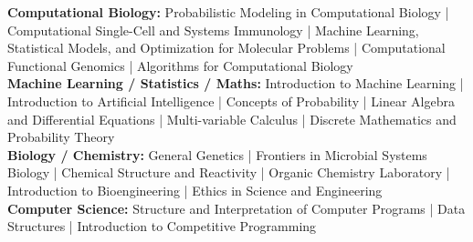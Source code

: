 \newcommand{\coursework}[2]{
    \vspace{4pt}
    \textbf{#1:} #2 \\
}


\coursework{Computational Biology}{Probabilistic Modeling in Computational Biology | Computational Single-Cell and Systems Immunology | Machine Learning, Statistical Models, and Optimization for Molecular Problems | Computational Functional Genomics | Algorithms for Computational Biology }

\coursework{Machine Learning / Statistics / Maths}{Introduction to Machine Learning | Introduction to Artificial Intelligence | Concepts of Probability | Linear Algebra and Differential Equations | Multi-variable Calculus | Discrete Mathematics and Probability Theory}

\coursework{Biology / Chemistry}{General Genetics | Frontiers in Microbial Systems Biology | Chemical Structure and Reactivity | Organic Chemistry Laboratory | Introduction to Bioengineering | Ethics in Science and Engineering}

\coursework{Computer Science}{Structure and Interpretation of Computer Programs | Data Structures | Introduction to Competitive Programming}
